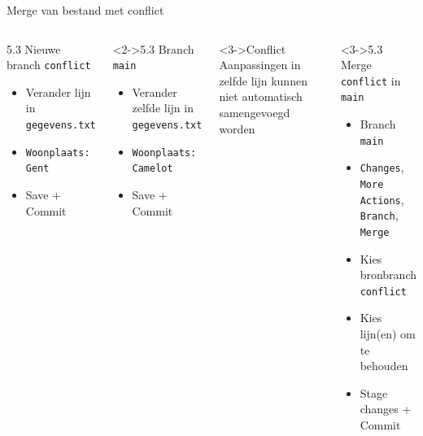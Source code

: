 \documentclass
[kulak,outline] %
{kulakbeamer}
\begin{document}
	 \begin{frame}{Merge van bestand \alert{met} conflict}
		\begin{columns}[T]
            \begin{block}{5.3 Nieuwe branch \texttt{conflict}}
				\begin{itemize}
					\item Verander lijn in \texttt{gegevens.txt}
					\item[] \texttt{Woonplaats: Gent}
					\item Save + Commit
				\end{itemize}
			\end{block}
            \begin{block}<2->{5.3 Branch \texttt{main}}
				\begin{itemize}
					\item Verander zelfde lijn in \texttt{gegevens.txt}
					\item[] \texttt{Woonplaats: Camelot}
					\item Save + Commit
				\end{itemize}
			\end{block}
			\begin{alertblock}<3->{Conflict}
				Aanpassingen in zelfde lijn kunnen niet automatisch samengevoegd worden
			\end{alertblock}
						\begin{block}<3->{5.3 Merge \texttt{conflict} in \texttt{main}}
				\begin{itemize}
                    \item Branch \texttt{main}
                    \item \texttt{Changes}, \texttt{More Actions},\newline
					\texttt{Branch}, \texttt{Merge}
                    \item Kies bronbranch \texttt{conflict}
                    \item Kies lijn(en) om te behouden
                    \item Stage changes + Commit
				\end{itemize}
                \end{block}
			\end{columns}
	\end{frame}
\end{document}
